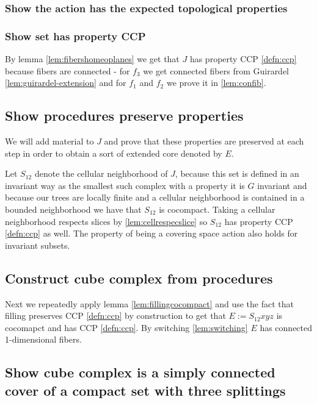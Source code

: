\documentclass[12pt,parskip=full]{report}
\theoremstyle{plain}
\theoremstyle{definition}
\begin{document}
\subsubsection{Show the action has the expected topological properties}


\subsubsection{Show set has property CCP}
        
        By lemma \ref{lem:fibershomeoplanes} we get that \(J\) has property CCP \ref{defn:ccp} because fibers are connected - for $f_3$ we get connected fibers from Guirardel \ref{lem:guirardel-extension} and for $f_1$ and $f_2$ we prove it in \ref{lem:confib}.

\subsection{Show procedures preserve properties}

We will add material to $J$ and prove that these properties are preserved at each step in order to obtain a sort of extended core denoted by $E$.

Let \(S_{12}\) denote the cellular neighborhood of \(J\), because this set is defined in an invariant way as the smallest such complex with a property it is \(G\) invariant and because our trees are locally finite and a cellular neighborhood is contained in a bounded neighborhood we have that \(S_{12}\) is cocompact. Taking a cellular neighborhood respects slices by \ref{lem:cellrespecslice}  so \(S_{12}\) has property CCP \ref{defn:ccp} as well. The property of being a covering space action also holds for invariant subsets.
        

\subsection{Construct cube complex from procedures}

Next we repeatedly apply lemma \ref{lem:fillingcocompact} and use the fact that filling preserves CCP \ref{defn:ccp} by construction to get that \(E:= S_{12}xyz\) is cocomapct and has CCP \ref{defn:ccp}. By switching \ref{lem:switching} \(E\) has connected 1-dimensional fibers. 

\subsection{Show cube complex is a simply connected cover of a compact set with three splittings}
\end{document}
